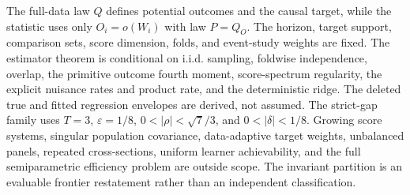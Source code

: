 The full-data law \(Q\) defines potential outcomes and the causal target, while the statistic uses only \(O_i=o(W_i)\) with law \(P=Q_O\). The horizon, target support, comparison sets, score dimension, folds, and event-study weights are fixed. The estimator theorem is conditional on i.i.d. sampling, foldwise independence, overlap, the primitive outcome fourth moment, score-spectrum regularity, the explicit nuisance rates and product rate, and the deterministic ridge. The deleted true and fitted regression envelopes are derived, not assumed. The strict-gap family uses \(T=3\), \(\varepsilon=1/8\), \(0<|\rho|<\sqrt7/3\), and \(0<|\delta|<1/8\). Growing score systems, singular population covariance, data-adaptive target weights, unbalanced panels, repeated cross-sections, uniform learner achievability, and the full semiparametric efficiency problem are outside scope. The invariant partition is an evaluable frontier restatement rather than an independent classification.
